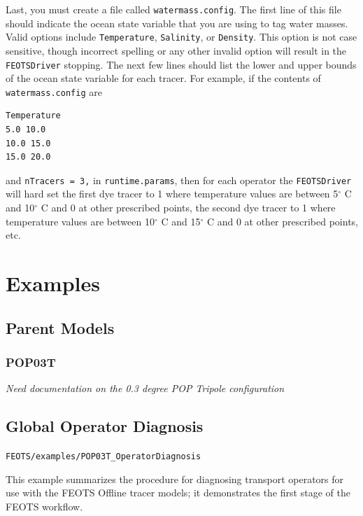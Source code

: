 \documentclass{softwaremanual}
\begin{document}
Last, you must create a file called \texttt{watermass.config}. The first line of this file should indicate the ocean state variable that you are using to tag water masses. Valid options include \texttt{Temperature}, \texttt{Salinity}, or \texttt{Density}. This option is not case sensitive, though incorrect spelling or any other invalid option will result in the \texttt{FEOTSDriver} stopping. The next few lines should list the lower and upper bounds of the ocean state variable for each tracer. For example, if the contents of \texttt{watermass.config} are
\begin{verbatim}
Temperature
5.0 10.0
10.0 15.0
15.0 20.0
\end{verbatim}
and \texttt{nTracers = 3,} in \texttt{runtime.params}, then for each operator the \texttt{FEOTSDriver} will hard set the first dye tracer to 1 where temperature values are between 5$^\circ$ C and 10$^\circ$ C and 0 at other prescribed points, the second dye tracer to 1 where temperature values are between 10$^\circ$ C and 15$^\circ$ C and 0 at other prescribed points, etc.

 
\chapter{Examples} \label{chapter:examples}

\section{Parent Models}
\subsection{POP03T} \label{sec:POP03T}
\textit{Need documentation on the 0.3 degree POP Tripole configuration}

\section{Global Operator Diagnosis}\label{sec:GlobalOperatorDiagnosis}
\begin{center}
\texttt{FEOTS/examples/POP03T\_OperatorDiagnosis}
\end{center}
This example summarizes the procedure for diagnosing transport operators for use with the FEOTS Offline tracer models; it demonstrates the first stage of the FEOTS workflow.
\end{document}
